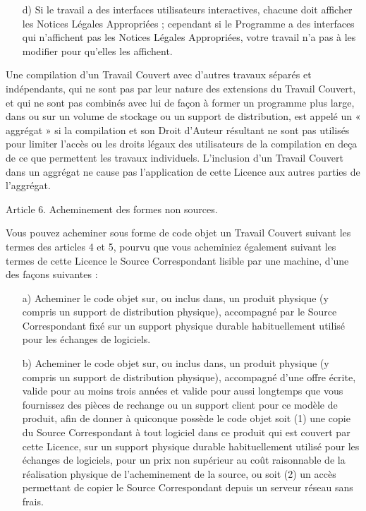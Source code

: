 {\begin{enumerate}
\item [d)] Si le travail a des interfaces utilisateurs interactives, chacune
     doit afficher les Notices Légales Appropriées ; cependant si le
     Programme a des interfaces qui n’affichent pas les Notices Légales
     Appropriées, votre travail n’a pas à les modifier pour qu’elles
     les affichent. 
\end{enumerate}

Une compilation d’un Travail Couvert avec d’autres travaux séparés et
indépendants, qui ne sont pas par leur nature des extensions du Travail
Couvert, et qui ne sont pas combinés avec lui de façon à former un
programme plus large, dans ou sur un volume de stockage ou un support
de distribution, est appelé un « aggrégat » si la compilation et son
Droit d’Auteur résultant ne sont pas utilisés pour limiter l’accès ou
les droits légaux des utilisateurs de la compilation en deça de ce que
permettent les travaux individuels. L’inclusion d’un Travail Couvert
dans un aggrégat ne cause pas l’application de cette Licence aux
autres parties de l’aggrégat.


Article 6. Acheminement des formes non sources.

Vous pouvez acheminer sous forme de code objet un Travail Couvert
suivant les termes des articles 4 et 5, pourvu que vous acheminiez
également suivant les termes de cette Licence le Source Correspondant
lisible par une machine, d’une des façons suivantes :
\begin{enumerate}
\item [a)]  Acheminer le code objet sur, ou inclus dans, un produit physique
     (y compris un support de distribution physique), accompagné par le
     Source Correspondant fixé sur un support physique durable
     habituellement utilisé pour les échanges de logiciels.

\item [b)]  Acheminer le code objet sur, ou inclus dans, un produit physique
     (y compris un support de distribution physique), accompagné d’une
     offre écrite, valide pour au moins trois années et valide pour
     aussi longtemps que vous fournissez des pièces de rechange ou un
     support client pour ce modèle de produit, afin de donner à
     quiconque possède le code objet soit (1) une copie du Source
     Correspondant à tout logiciel dans ce produit qui est couvert par
     cette Licence, sur un support physique durable habituellement
     utilisé pour les échanges de logiciels, pour un prix non supérieur
     au coût raisonnable de la réalisation physique de l’acheminement
     de la source, ou soit (2) un accès permettant de copier le Source
     Correspondant depuis un serveur réseau sans frais.


\end{enumerate}}
